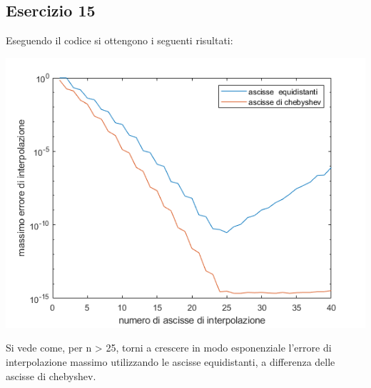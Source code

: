 \subsection{Esercizio 15}
Eseguendo il codice  si ottengono i seguenti risultati:

    
\includegraphics[scale=0.8]{capitolo4/interpol.png}

Si vede come, per n > 25, torni a crescere   in modo esponenziale l'errore di interpolazione massimo utilizzando le ascisse equidistanti, a differenza delle ascisse di chebyshev.